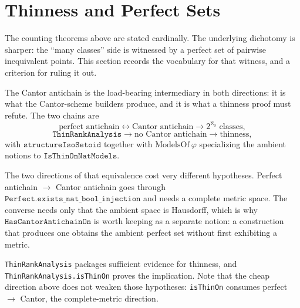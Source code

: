 \section{Thinness and Perfect Sets}\label{sec:thinness}

The counting theorems above are stated cardinally.  The underlying dichotomy is
sharper: the ``many classes'' side is witnessed by a perfect set of pairwise
inequivalent points.  This section records the vocabulary for that witness, and
a criterion for ruling it out.





The Cantor antichain is the load-bearing intermediary in both directions: it is
what the Cantor-scheme builders produce, and it is what a thinness proof must
refute.  The two chains are
\[
  \text{perfect antichain} \longleftrightarrow \text{Cantor antichain}
    \longrightarrow 2^{\aleph_0} \text{ classes},
\]
\[
  \mathtt{ThinRankAnalysis} \longrightarrow \text{no Cantor antichain}
    \longrightarrow \text{thinness},
\]
with $\mathtt{structureIsoSetoid}$ together with $\mathrm{ModelsOf}\ \varphi$
specializing the ambient notions to $\mathtt{IsThinOnNatModels}$.


The two directions of that equivalence cost very different hypotheses.  Perfect
antichain $\to$ Cantor antichain goes through
$\mathtt{Perfect.exists\_nat\_bool\_injection}$ and needs a complete metric
space.  The converse needs only that the ambient space is Hausdorff, which is
why $\mathtt{HasCantorAntichainOn}$ is worth keeping as a separate notion: a
construction that produces one obtains the ambient perfect set without first
exhibiting a metric.



\texttt{ThinRankAnalysis} packages sufficient evidence for thinness, and
\texttt{ThinRankAnalysis.isThinOn} proves the implication.  Note that the cheap
direction above does not weaken those hypotheses: \texttt{isThinOn} consumes
perfect $\to$ Cantor, the complete-metric direction.


